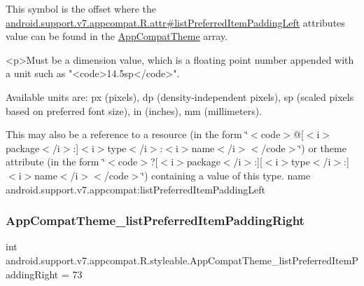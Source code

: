 This symbol is the offset where the \hyperlink{classandroid_1_1support_1_1v7_1_1appcompat_1_1R_1_1attr_a5638fec2ab8bb6a2c4fa1e10cc96648a}{android.\+support.\+v7.\+appcompat.\+R.\+attr\#list\+Preferred\+Item\+Padding\+Left} attribute\textquotesingle{}s value can be found in the \hyperlink{classandroid_1_1support_1_1v7_1_1appcompat_1_1R_1_1styleable_a5c42f89e8a410c323be34208d75c430b}{App\+Compat\+Theme} array.

\begin{DoxyVerb}      <p>Must be a dimension value, which is a floating point number appended with a unit such as "<code>14.5sp</code>".
\end{DoxyVerb}
 Available units are\+: px (pixels), dp (density-\/independent pixels), sp (scaled pixels based on preferred font size), in (inches), mm (millimeters). 

This may also be a reference to a resource (in the form \char`\"{}$<$code$>$@\mbox{[}$<$i$>$package$<$/i$>$\+:\mbox{]}$<$i$>$type$<$/i$>$\+:$<$i$>$name$<$/i$>$$<$/code$>$\char`\"{}) or theme attribute (in the form \char`\"{}$<$code$>$?\mbox{[}$<$i$>$package$<$/i$>$\+:\mbox{]}\mbox{[}$<$i$>$type$<$/i$>$\+:\mbox{]}$<$i$>$name$<$/i$>$$<$/code$>$\char`\"{}) containing a value of this type.  name android.\+support.\+v7.\+appcompat\+:list\+Preferred\+Item\+Padding\+Left \mbox{\label{classandroid_1_1support_1_1v7_1_1appcompat_1_1R_1_1styleable_a233f7ce58f3391f99dd01b686899d077}} 
\subsubsection{\texorpdfstring{App\+Compat\+Theme\+\_\+list\+Preferred\+Item\+Padding\+Right}{AppCompatTheme\_listPreferredItemPaddingRight}}
{\footnotesize\ttfamily int android.\+support.\+v7.\+appcompat.\+R.\+styleable.\+App\+Compat\+Theme\+\_\+list\+Preferred\+Item\+Padding\+Right = 73\hspace{0.3cm}{\ttfamily [static]}}

